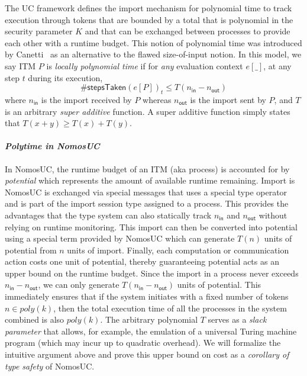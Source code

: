 The UC framework defines the import mechanism for polynomial time to track execution through tokens that
are bounded by a total that is polynomial in the security parameter $K$ and that can be exchanged between processes to provide each other with a runtime budget.
This notion of polynomial time was introduced by Canetti~\cite{canettiUC} as an alternative to the flawed size-of-input notion. 
In this model, we say ITM $P$ is \emph{locally polynomial time} if for \emph{any} evaluation context $e[\_]$, at any step $t$ during its execution,
\[
\#\textsf{stepsTaken}(e[P])_{t} \le T(n_{\textsf{in}} - n_{\textsf{out}})
\]
where $n_{\textsf{in}}$ is the import received by $P$ whereas $n_{\textsf{out}}$ is the import sent by $P$, and $T$ is an arbitrary
\emph{super additive} function.
A super additive function simply states that $T(x+y) \geq T(x) + T(y)$.

\paragraph*{\textbf{\textit{Polytime in NomosUC}}}
In NomosUC, the runtime budget of an ITM (aka process) is accounted for by \emph{potential} which represents the amount
of available runtime remaining.
Import is NomosUC is exchanged via special messages that uses a special type operator and is part of the import session type
assigned to a process.
This provides the advantages that the type system can also statically track $n_\textsf{in}$ and $n_\textsf{out}$
without relying on runtime monitoring.
This import can then be converted into potential using a special term provided by NomosUC which can generate $T(n)$
units of potential from $n$ units of import.
Finally, each computation or communication action costs one unit of potential, thereby guaranteeing 
potential acts as an upper bound on the runtime budget.
Since the import in a process never exceeds $n_{\textsf{in}} - n_{\textsf{out}}$, we can only generate
$T(n_{\textsf{in}} - n_{\textsf{out}})$ units of potential.
This immediately ensures that if the system initiates with a fixed number of tokens $n \in poly(k)$,
then the total execution time of all the processes in the system combined is also $poly(k)$.
The arbitrary polynomial $T$ serves as a \emph{slack parameter} that allows, for example,
the emulation of a universal Turing machine program (which may incur up to quadratic overhead).
We will formalize the intuitive argument above and prove this upper bound on cost as a \emph{corollary
of type safety} of NomosUC.

